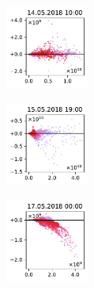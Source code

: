 \begin{figure}[H]
    \centering
    \begin{subfigure}
        \centering
        \includegraphics[width=0.30\textwidth,valign=t]{evaluation/figures/perturbations/perturbation-14.05.2018:10.00-aerosols-div-1.5.pdf}
    \end{subfigure}
    \begin{subfigure}
        \centering
        \includegraphics[width=0.30\textwidth,valign=t]{evaluation/figures/perturbations/perturbation-15.05.2018:19.00-aerosols-div-1.5.pdf}
    \end{subfigure}
    \begin{subfigure}
        \centering
        \includegraphics[width=0.30\textwidth,valign=t]{evaluation/figures/perturbations/perturbation-17.05.2018:00.00-aerosols-div-1.5.pdf}
    \end{subfigure}


\end{figure}
